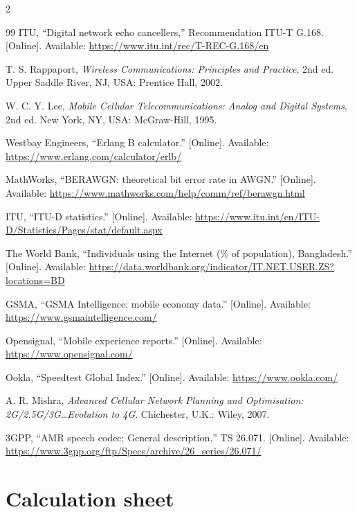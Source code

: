 \documentclass[9pt,a4paper]{extarticle}
\begin{document}
\begin{multicols}{2}
\begin{thebibliography}{99}
 ITU, ``Digital network echo cancellers,'' Recommendation ITU-T G.168. [Online].
Available: \url{https://www.itu.int/rec/T-REC-G.168/en}

 T. S. Rappaport, \emph{Wireless Communications: Principles and Practice},
2nd ed. Upper Saddle River, NJ, USA: Prentice Hall, 2002.

 W. C. Y. Lee, \emph{Mobile Cellular Telecommunications: Analog and Digital
Systems}, 2nd ed. New York, NY, USA: McGraw-Hill, 1995.

 Westbay Engineers, ``Erlang B calculator.'' [Online]. Available:
\url{https://www.erlang.com/calculator/erlb/}

 MathWorks, ``BERAWGN: theoretical bit error rate in AWGN.'' [Online].
Available: \url{https://www.mathworks.com/help/comm/ref/berawgn.html}

 ITU, ``ITU-D statistics.'' [Online]. Available:
\url{https://www.itu.int/en/ITU-D/Statistics/Pages/stat/default.aspx}

 The World Bank, ``Individuals using the Internet (\% of population),
Bangladesh.'' [Online]. Available:
\url{https://data.worldbank.org/indicator/IT.NET.USER.ZS?locations=BD}

 GSMA, ``GSMA Intelligence: mobile economy data.'' [Online]. Available:
\url{https://www.gsmaintelligence.com/}

 Opensignal, ``Mobile experience reports.'' [Online]. Available:
\url{https://www.opensignal.com/}

 Ookla, ``Speedtest Global Index.'' [Online]. Available:
\url{https://www.ookla.com/}

 A. R. Mishra, \emph{Advanced Cellular Network Planning and Optimisation:
2G/2.5G/3G\ldots Evolution to 4G}. Chichester, U.K.: Wiley, 2007.

 3GPP, ``AMR speech codec; General description,'' TS 26.071. [Online]. Available:
\url{https://www.3gpp.org/ftp/Specs/archive/26_series/26.071/}

\end{thebibliography}
\end{multicols}

\appendix
\section{Calculation sheet}
\label{app:calc}
\end{document}
